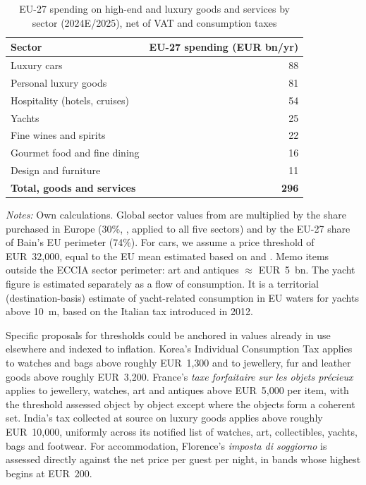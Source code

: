 \documentclass[../../main]{subfiles}
\begin{document}
\begin{table}[ht]
\centering
\small
\caption{EU-27 spending on high-end and luxury goods and services by sector (2024E/2025), net of VAT and consumption taxes}
\label{tab:eu27sectors}
\begin{tabular}{@{}l r@{}}
\toprule
Sector & EU-27 spending (EUR bn/yr) \\
\midrule
Luxury cars& 88\\
Personal luxury goods& 81  \\
Hospitality (hotels, cruises)      & 54  \\
Yachts& 25\\
Fine wines and spirits& 22\\
Gourmet food and fine dining& 16\\
Design and furniture& 11\\
\midrule
\textbf{Total, goods and services} & \textbf{296}\\
\bottomrule
\end{tabular}

\begin{minipage}{0.95\linewidth}
\footnotesize
\emph{Notes:} Own calculations. Global sector values from \citet{ECCIA2025} are multiplied by the share purchased in Europe (30\%, \citealp{ECCIA2025}, applied to all five sectors) and by the EU-27 share of Bain's EU perimeter (74\%).
For cars, we assume a price threshold of EUR~32{,}000, equal to the EU mean estimated based on \citep{UNRAE2025} and \citep{DAT2026}.  %
Memo items outside the ECCIA sector perimeter: art and antiques $\approx$ EUR~5~bn. The yacht figure is estimated separately as a flow of consumption. It is a territorial (destination-basis) estimate of yacht-related consumption in EU waters for yachts above 10~m, based on the Italian tax introduced in 2012.
\end{minipage}
\end{table}
\normalsize
\FloatBarrier

Specific proposals for thresholds could be anchored in values already in use elsewhere and indexed to inflation. Korea's Individual Consumption Tax applies to watches and bags above roughly EUR~1{,}300 and to
jewellery, fur and leather goods above roughly EUR~3{,}200. France's \emph{taxe forfaitaire sur
les objets pr\'ecieux} applies to jewellery, watches, art and antiques above EUR~5{,}000 per
item, with the threshold assessed object by object except where the objects form a coherent set. %
India's tax collected at source on luxury goods applies above roughly EUR~10{,}000, uniformly
across its notified list of watches, art, collectibles, yachts, bags and footwear. For accommodation, Florence's \emph{imposta di soggiorno} is assessed directly against the
net price per guest per night, in bands whose highest begins at EUR~200.
\end{document}

